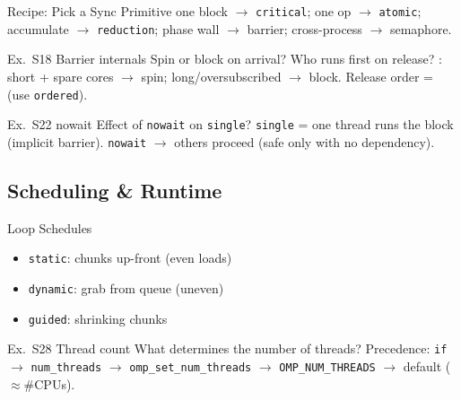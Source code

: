 \multend

\begin{KR}{Recipe: Pick a Sync Primitive}
    one block $\to$ \texttt{critical}; one op $\to$ \texttt{atomic}; accumulate $\to$ \texttt{reduction}; phase wall $\to$ barrier; cross-process $\to$ semaphore.
\end{KR}

\begin{example2}{Ex.\ S18 Barrier internals}
    Spin or block on arrival? Who runs first on release?
    \tcblower
    : short + spare cores $\to$ spin; long/oversubscribed $\to$ block. Release order =  (use \texttt{ordered}).
\end{example2}

\begin{example2}{Ex.\ S22 nowait}
    Effect of \texttt{nowait} on \texttt{single}?
    \tcblower
    \texttt{single} = one thread runs the block (implicit barrier). \texttt{nowait}  $\to$ others proceed (safe only with no dependency).
\end{example2}

\subsection{Scheduling \& Runtime}

\begin{concept}{Loop Schedules}
    \begin{itemize}
        \item \texttt{static}: chunks up-front (even loads)
        \item \texttt{dynamic}: grab from queue (uneven)
        \item \texttt{guided}: shrinking chunks
    \end{itemize}
\end{concept}

\begin{example2}{Ex.\ S28 Thread count}
    What determines the number of threads?
    \tcblower
    Precedence: \texttt{if} $\to$ \texttt{num\_threads} $\to$ \texttt{omp\_set\_num\_threads} $\to$ \texttt{OMP\_NUM\_THREADS} $\to$ default ($\approx$\#CPUs).
\end{example2}
